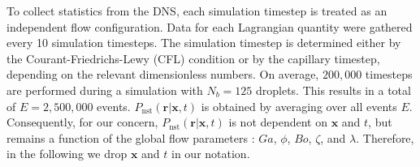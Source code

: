 \documentclass[11pt]{My_preprint}
\begin{document}
To collect statistics from the DNS, each simulation timestep is treated as an independent flow configuration. 
Data for each Lagrangian quantity were gathered every 10 simulation timesteps. 
The simulation timestep is determined either by the Courant-Friedrichs-Lewy (CFL) condition or by the capillary timestep, depending on the relevant dimensionless numbers.
On average, $200,000$ timesteps are performed during a simulation with $N_b = 125$ droplets. 
This results in a total of $E = 2,500,000$ events.
$P_\text{nst}(\textbf{r}|\textbf{x},t)$ is obtained by averaging over all events $E$. 
Consequently, for our concern, $P_\text{nst}(\textbf{r}|\textbf{x},t)$ is not dependent on $\mathbf{x}$ and $t$, but remains a function of the global flow parameters :  $Ga$, $\phi$, $Bo$, $\zeta$, and $\lambda$.
Therefore, in the following we drop $\mathbf{x}$ and $t$ in our notation. 
\end{document}
